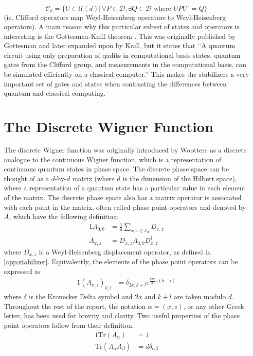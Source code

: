 \documentclass[../3Wworkreport.tex]{subfiles}
\begin{document}
\begin{appendices}
\begin{equation}
	\mathcal{C}_d = \{U \in \mathcal{U}(d) | \,\forall P \in \mathcal{D}, \exists Q \in \mathcal{D} \text{ where } U P U^\dag = Q\}
\end{equation}
(ie. Clifford operators map Weyl-Heisenberg operators to Weyl-Heisenberg operators). A main reason why this particular subset of states and operators is interesting is the Gottesman-Knill theorem \cite{Gottesman1998}. This was originally published by Gottesman and later expanded upon by Knill, but it states that \lq\lq{}A quantum circuit using only preparation of qudits in computational basis states, quantum gates from the Clifford group, and measurements in the computational basis, can be simulated efficiently on a classical computer.\rq\rq{} This makes the stabilizers a very important set of gates and states when contrasting the differences between quantum and classical computing.

\chapter{The Discrete Wigner Function}
\label{app:dwf}

The discrete Wigner function was originally introduced by Wootters \cite{Wootters1987} as a discrete analogue to the continuous Wigner function, which is a representation of continuous quantum states in phase space. The discrete phase space can be thought of as a $d$-by-$d$ matrix (where $d$ is the dimension of the Hilbert space), where a representation of a quantum state has a particular value in each element of the matrix. The discrete phase space also has a matrix operator is associated with each point in the matrix, often called phase point operators and denoted by $A$, which have the following definition:
\begin{alignat}{1}
	A_{0,0} &= \frac{1}{d} \sum\limits_{x,z\in\mathbb{Z}_d} D_{x,z}\\
	A_{x,z} &= D_{x,z}A_{0,0}D_{x,z}^\dag
\end{alignat}
where $D_{x,z}$ is a Weyl-Heisenberg displacement operator, as defined in \autoref{app:stabilizer}. Equivalently, the elements of the phase point operators can be expressed as
\begin{alignat}{1}
	(A_{x,z})_{k,l} &= \delta_{2x,k+l}e^{\frac{i2\pi}{d}z(k-l)}
\end{alignat}
where $\delta$ is the Kronecker Delta symbol and $2x$ and $k+l$ are taken modulo $d$. Throughout the rest of the report, the notation $\alpha = (x,z)$, or any other Greek letter, has been used for brevity and clarity. Two useful properties of the phase point operators follow from their definition.
\begin{alignat}{1}
	\text{Tr}(A_\alpha) &= 1\\
	\text{Tr}(A_\alpha A_\beta) &= d \delta_{\alpha\beta}
\end{alignat}


\end{appendices}
\end{document}
